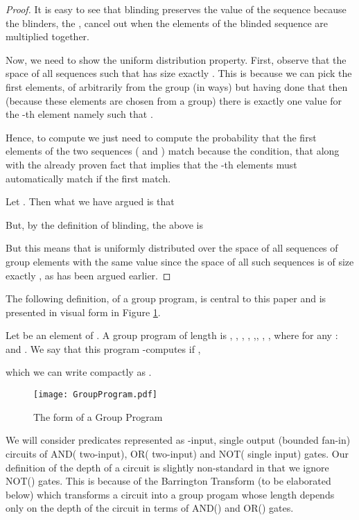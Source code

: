 \begin{proof}
It is  easy to see that  blinding preserves the value  of the sequence
because the blinders,  the , cancel out when  the elements of the
blinded sequence are multiplied together.

Now, we need to show the uniform distribution property. First, observe
that  the space  of all  sequences   such that   has  size exactly  .  This is  because we
can pick  the first   elements,  of
 arbitrarily from the group  (in  ways) but having done
that then  (because these elements are  chosen from a  group) there is
exactly   one   value   for    the   -th   element      namely
    such    that   .

Hence, to  compute  we just  need to
compute  the probability  that the  first   elements  of the  two
sequences  ( and )  match because  the condition,
that    along with  the  already
proven  fact that  
implies that the -th elements must automatically match if the first
 match.

Let . Then what we have argued
is that

But, by the definition of blinding, the above is 


But this  means that   is uniformly  distributed over
the space of all sequences of group elements with the same value since
the space of all such sequences is of size exactly , as has
been argued earlier.

\end{proof}

The following definition, of a group program, is central to this paper
and is presented in visual form in Figure \ref{fig:groupprogram}.

\begin{definition}
Let    be an  element  of .  A  group  program of  length
\emph{}   is  ,  ,   ,  ,
 ,, , ,   where for any :
 and  .  We  say that
this program -computes   if
,


which  we can write  compactly as  .
\end{definition}

\begin{figure}
\centering
\texttt{[image: GroupProgram.pdf]}
\vspace{-0.8in}
\caption{The form of a Group Program}
\label{fig:groupprogram}
\end{figure}

We will  consider predicates  represented as -input,  single output
(bounded  fan-in)  circuits   of  AND(  two-input),  OR(
two-input) and  NOT( single input) gates. Our  definition of the
depth  of  a  circuit  is  slightly non-standard  in  that  we  ignore
NOT() gates. This is because  of the Barrington Transform (to be
elaborated below) which transforms a circuit into a group progam whose
length  depends  only  on  the  depth  of  the  circuit  in  terms  of
AND() and OR() gates.

